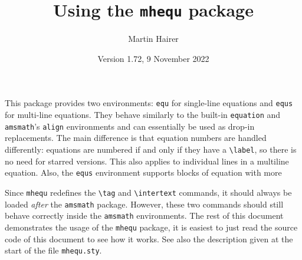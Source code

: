 \documentclass{article}
\begin{document}
\title{Using the \texttt{mhequ} package}
\author{Martin Hairer}
\date{Version 1.72, 9 November 2022}
\maketitle
\thispagestyle{empty}


This package provides two environments: \texttt{equ} for single-line equations
and \texttt{equs} for multi-line equations. They behave similarly to the built-in
\texttt{equation} and \texttt{amsmath}'s \texttt{align} environments and can essentially
be used as drop-in replacements. The main difference is that equation numbers are 
handled differently: equations are numbered if and only if they have a \verb|\label|,
so there is no need for starred versions. This also applies to individual lines in
a multiline equation. Also, the \texttt{equs} environment supports blocks of equation
with more

Since \texttt{mhequ} redefines the \verb|\tag| and \verb|\intertext| commands, it should
always be loaded \textit{after} the \texttt{amsmath} package. However, these
two commands should still behave correctly inside the \texttt{amsmath} environments.
The rest of this document demonstrates the usage of the \texttt{mhequ} package,
it is easiest to just read the source code of this document to see how it works.
See also the description given at the start of the file \texttt{mhequ.sty}.
\end{document}
